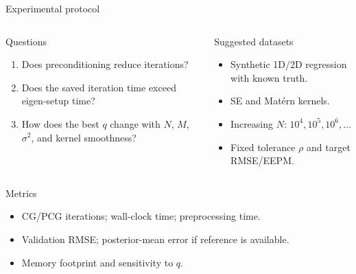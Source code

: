 \documentclass[aspectratio=169,11pt]{ctexbeamer}
\begin{document}
\begin{frame}{Experimental protocol}
\begin{columns}[T,onlytextwidth]
\begin{block}{Questions}
\begin{enumerate}
  \item Does preconditioning reduce iterations?
  \item Does the saved iteration time exceed eigen-setup time?
  \item How does the best $q$ change with $N$, $M$, $\sigma^2$, and kernel smoothness?
\end{enumerate}
\end{block}
\begin{block}{Suggested datasets}
\begin{itemize}
  \item Synthetic 1D/2D regression with known truth.
  \item SE and Mat\'ern kernels.
  \item Increasing $N$: $10^4,10^5,10^6,\ldots$
  \item Fixed tolerance $\rho$ and target RMSE/EEPM.
\end{itemize}
\end{block}
\end{columns}
\vspace{0.25cm}
\begin{block}{Metrics}
\begin{itemize}
  \item CG/PCG iterations; wall-clock time; preprocessing time.
  \item Validation RMSE; posterior-mean error if reference is available.
  \item Memory footprint and sensitivity to $q$.
\end{itemize}
\end{block}
\end{frame}
\end{document}
